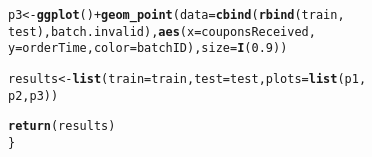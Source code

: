 \documentclass[10pt]{report}
\makeatletter
\newcommand{\hlnum}[1]{\textcolor[rgb]{0.686,0.059,0.569}{#1}}%
\newcommand{\hlopt}[1]{\textcolor[rgb]{0,0,0}{#1}}%
\newcommand{\hlstd}[1]{\textcolor[rgb]{0.345,0.345,0.345}{#1}}%
\newcommand{\hlkwb}[1]{\textcolor[rgb]{0.69,0.353,0.396}{#1}}%
\newcommand{\hlkwc}[1]{\textcolor[rgb]{0.333,0.667,0.333}{#1}}%
\newcommand{\hlkwd}[1]{\textcolor[rgb]{0.737,0.353,0.396}{\textbf{#1}}}%
\newenvironment{kframe}{%
 \def\at@end@of@kframe{}%
 \ifinner\ifhmode%
  \def\at@end@of@kframe{\end{minipage}}%
  \begin{minipage}{\columnwidth}%
 \fi\fi%
 \def\FrameCommand##1{\hskip\@totalleftmargin \hskip-\fboxsep
 \colorbox{shadecolor}{##1}\hskip-\fboxsep
     \hskip-\linewidth \hskip-\@totalleftmargin \hskip\columnwidth}%
 \MakeFramed {\advance\hsize-\width
   \@totalleftmargin\z@ \linewidth\hsize
   \@setminipage}}%
 {\par\unskip\endMakeFramed%
 \at@end@of@kframe}
\newenvironment{knitrout}{}{} %
\makeatother
\begin{document}
\begin{knitrout}
\begin{kframe}
\begin{alltt}
    \hlstd{p3} \hlkwb{<-} \hlkwd{ggplot}\hlstd{()} \hlopt{+} \hlkwd{geom_point}\hlstd{(}\hlkwc{data} \hlstd{=} \hlkwd{cbind}\hlstd{(}\hlkwd{rbind}\hlstd{(train,}
        \hlstd{test), batch.invalid),} \hlkwd{aes}\hlstd{(}\hlkwc{x} \hlstd{= couponsReceived,}
        \hlkwc{y} \hlstd{= orderTime,} \hlkwc{color} \hlstd{= batchID),} \hlkwc{size} \hlstd{=} \hlkwd{I}\hlstd{(}\hlnum{0.9}\hlstd{))}

    \hlstd{results} \hlkwb{<-} \hlkwd{list}\hlstd{(}\hlkwc{train} \hlstd{= train,} \hlkwc{test} \hlstd{= test,} \hlkwc{plots} \hlstd{=} \hlkwd{list}\hlstd{(p1,}
        \hlstd{p2, p3))}

    \hlkwd{return}\hlstd{(results)}
\hlstd{\}}
\end{alltt}
\end{kframe}
\end{knitrout}
\end{document}

